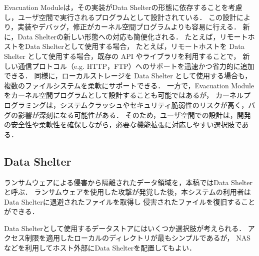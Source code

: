 Evacuation Moduleは，その実装がData Shelterの形態に依存することを考慮し，ユーザ空間で実行されるプログラムとして設計されている．
この設計により，実装やデバッグ，修正がカーネル空間プログラムよりも容易に行える．
新に，Data Shelterの新しい形態への対応も簡便化される．
たとえば，リモートホストをData Shelterとして使用する場合，
たとえば，リモートホストを Data Shelter として使用する場合，既存の API やライブラリを利用することで，
新しい通信プロトコル（e.g. HTTP，FTP）へのサポートを迅速かつ省力的に追加できる．
同様に，ローカルストレージを Data Shelter として使用する場合も，複数のファイルシステムを柔軟にサポートできる．
一方で，Evacuation Module をカーネル空間プログラムとして設計することも可能ではあるが，
カーネルプログラミングは，システムクラッシュやセキュリティ脆弱性のリスクが高く，バグの影響が深刻になる可能性がある．
そのため，ユーザ空間での設計は，開発の安全性や柔軟性を確保しながら，必要な機能拡張に対応しやすい選択肢である．

\subsection{Data Shelter}
ランサムウェアによる侵害から隔離されたデータ領域を，本稿ではData Shelterと呼ぶ．
ランサムウェアを使用した攻撃が発覚した後，本システムの利用者はData Shelterに退避されたファイルを取得し
侵害されたファイルを復旧することができる．

Data Shelterとして使用するデータストアにはいくつか選択肢が考えられる．
アクセス制限を適用したローカルのディレクトリが最もシンプルであるが，
NASなどを利用してホスト外部にData Shelterを配置してもよい．
